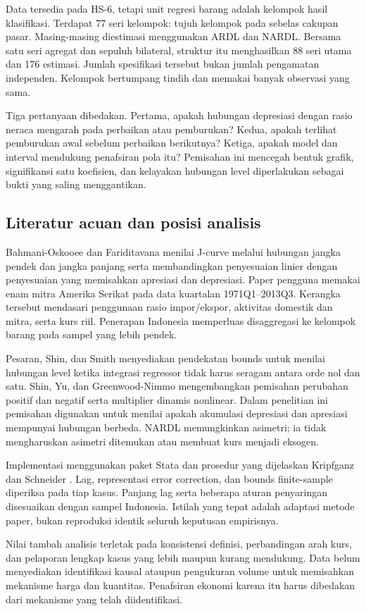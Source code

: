 Data tersedia pada HS-6, tetapi unit regresi barang adalah kelompok hasil klasifikasi. Terdapat 77 seri kelompok: tujuh kelompok pada sebelas cakupan pasar. Masing-masing diestimasi menggunakan ARDL dan NARDL. Bersama satu seri agregat dan sepuluh bilateral, struktur itu menghasilkan 88 seri utama dan 176 estimasi. Jumlah spesifikasi tersebut bukan jumlah pengamatan independen. Kelompok bertumpang tindih dan memakai banyak observasi yang sama.

Tiga pertanyaan dibedakan. Pertama, apakah hubungan depresiasi dengan rasio neraca mengarah pada perbaikan atau pemburukan? Kedua, apakah terlihat pemburukan awal sebelum perbaikan berikutnya? Ketiga, apakah model dan interval mendukung penafsiran pola itu? Pemisahan ini mencegah bentuk grafik, signifikansi satu koefisien, dan kelayakan hubungan level diperlakukan sebagai bukti yang saling menggantikan.

\subsection{Literatur acuan dan posisi analisis}
Bahmani-Oskooee dan Fariditavana \cite{bahmani} menilai J-curve melalui hubungan jangka pendek dan jangka panjang serta membandingkan penyesuaian linier dengan penyesuaian yang memisahkan apresiasi dan depresiasi. Paper pengguna memakai enam mitra Amerika Serikat pada data kuartalan 1971Q1--2013Q3. Kerangka tersebut mendasari penggunaan rasio impor/ekspor, aktivitas domestik dan mitra, serta kurs riil. Penerapan Indonesia memperluas disaggregasi ke kelompok barang pada sampel yang lebih pendek.

Pesaran, Shin, dan Smith \cite{pss} menyediakan pendekatan bounds untuk menilai hubungan level ketika integrasi regressor tidak harus seragam antara orde nol dan satu. Shin, Yu, dan Greenwood-Nimmo \cite{shin} mengembangkan pemisahan perubahan positif dan negatif serta multiplier dinamis nonlinear. Dalam penelitian ini pemisahan digunakan untuk menilai apakah akumulasi depresiasi dan apresiasi mempunyai hubungan berbeda. NARDL memungkinkan asimetri; ia tidak mengharuskan asimetri ditemukan atau membuat kurs menjadi eksogen.

Implementasi menggunakan paket Stata dan prosedur yang dijelaskan Kripfganz dan Schneider \cite{ks}. Lag, representasi error correction, dan bounds finite-sample diperiksa pada tiap kasus. Panjang lag serta beberapa aturan penyaringan disesuaikan dengan sampel Indonesia. Istilah yang tepat adalah adaptasi metode paper, bukan reproduksi identik seluruh keputusan empirisnya.

Nilai tambah analisis terletak pada konsistensi definisi, perbandingan arah kurs, dan pelaporan lengkap kasus yang lebih maupun kurang mendukung. Data belum menyediakan identifikasi kausal ataupun pengukuran volume untuk memisahkan mekanisme harga dan kuantitas. Penafsiran ekonomi karena itu harus dibedakan dari mekanisme yang telah diidentifikasi.
